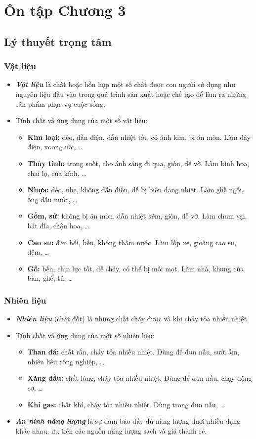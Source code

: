 \documentclass[Main.tex]{subfiles}
\begin{document}
\section{Ôn tập Chương 3}
\subsection{Lý thuyết trọng tâm}
\begin{kienthuccannho}
	\subsubsection{Vật liệu}
	\begin{itemize}
		\item \textbf{\textit{Vật liệu}} là chất hoặc hỗn hợp một số chất được con người sử dụng như nguyên liệu đầu vào trong quá trình sản xuất hoặc chế tạo để làm ra những sản phẩm phục vụ cuộc sống.
		\item Tính chất và ứng dụng của một số vật liệu:
		\begin{itemize}
			\item \textbf{Kim loại:} dẻo, dẫn điện, dẫn nhiệt tốt, có ánh kim, bị ăn mòn. Làm dây điện, xoong nồi, …
			\item \textbf{Thủy tinh:} trong suốt, cho ánh sáng đi qua, giòn, dễ vỡ. Làm bình hoa, chai lọ, cửa kính, …
			\item \textbf{Nhựa:} dẻo, nhẹ, không dẫn điện, dễ bị biến dạng nhiệt. Làm ghế ngồi, ống dẫn nước, …
			\item \textbf{Gốm, sứ:} không bị ăn mòn, dẫn nhiệt kém, giòn, dễ vỡ. Làm chum vại, bát đĩa, chậu hoa, …
			\item \textbf{Cao su:} đàn hồi, bền, không thấm nước. Làm lốp xe, gioăng cao su, đệm, …
			\item \textbf{Gỗ:} bền, chịu lực tốt, dễ cháy, có thể bị mối mọt. Làm nhà, khung cửa, bàn, ghế, tủ, …
		\end{itemize}
	\end{itemize}
	\subsubsection{Nhiên liệu}
	\begin{itemize}
		\item \textbf{\textit{Nhiên liệu}} (chất đốt) là những chất cháy được và khi cháy tỏa nhiều nhiệt.
		\item Tính chất và ứng dụng của một số nhiên liệu:
		\begin{itemize}
			\item \textbf{Than đá:} chất rắn, cháy tỏa nhiều nhiệt. Dùng để đun nấu, sưởi ấm, nhiên liệu công nghiệp, …
			\item \textbf{Xăng dầu:} chất lỏng, cháy tỏa nhiều nhiệt. Dùng để đun nấu, chạy động cơ, …
			\item \textbf{Khí gas:} chất khí, cháy tỏa nhiều nhiệt. Dùng trong đun nấu, …
		\end{itemize}
		\item \textbf{\textit{An ninh năng lượng}} là sự đảm bảo đầy đủ năng lượng dưới nhiều dạng khác nhau, ưu tiên các nguồn năng lượng sạch và giá thành rẻ.
	\end{itemize}

\end{kienthuccannho}
\end{document}
